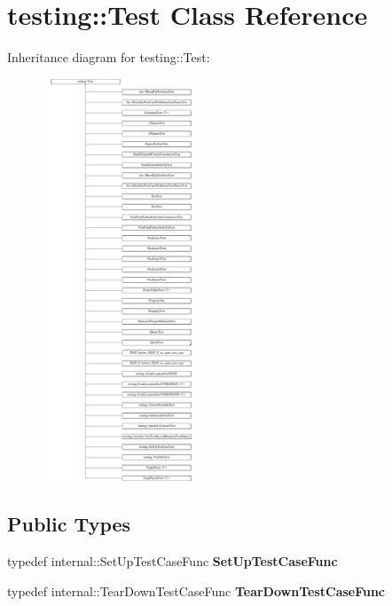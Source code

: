 \hypertarget{classtesting_1_1_test}{}\section{testing\+:\+:Test Class Reference}
\label{classtesting_1_1_test}
Inheritance diagram for testing\+:\+:Test\+:\begin{figure}[H]
\begin{center}
\leavevmode
\includegraphics[height=12.000000cm]{classtesting_1_1_test}
\end{center}
\end{figure}
\subsection*{Public Types}
\begin{DoxyCompactItemize}
\item 
\mbox{\label{classtesting_1_1_test_a5f2a051d1d99c9b784c666c586186cf9}} 
typedef internal\+::\+Set\+Up\+Test\+Case\+Func {\bfseries Set\+Up\+Test\+Case\+Func}
\item 
\mbox{\label{classtesting_1_1_test_aa0f532e93b9f3500144c53f31466976c}} 
typedef internal\+::\+Tear\+Down\+Test\+Case\+Func {\bfseries Tear\+Down\+Test\+Case\+Func}
\end{DoxyCompactItemize}
